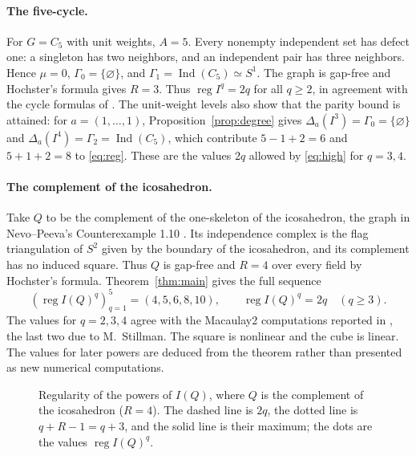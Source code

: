 \documentclass[11pt,a4paper]{article}
\theoremstyle{definition}
\newcommand{\reg}{\operatorname{reg}}
\newcommand{\Ind}{\operatorname{Ind}}
\begin{document}
\paragraph{The five-cycle.}
For $G=C_5$ with unit weights, $A=5$. Every nonempty independent set has defect one: a singleton has two neighbors, and an independent pair has three neighbors. Hence $\mu=0$, $\Gamma_0=\{\varnothing\}$, and $\Gamma_1=\Ind(C_5)\simeq S^1$. The graph is gap-free and Hochster's formula gives $R=3$. Thus $\reg I^q=2q$ for all $q\geq2$, in agreement with the cycle formulas of \cite{BHT}. The unit-weight levels also show that the parity bound is attained: for $a=(1,\ldots,1)$, Proposition~\ref{prop:degree} gives $\Delta_a(I^3)=\Gamma_0=\{\varnothing\}$ and $\Delta_a(I^4)=\Gamma_2=\Ind(C_5)$, which contribute $5-1+2=6$ and $5+1+2=8$ to \eqref{eq:reg}. These are the values $2q$ allowed by \eqref{eq:high} for $q=3,4$.

\paragraph{The complement of the icosahedron.}
Take $Q$ to be the complement of the one-skeleton of the icosahedron, the graph in Nevo--Peeva's Counterexample 1.10 \cite{NP}. Its independence complex is the flag triangulation of $S^2$ given by the boundary of the icosahedron, and its complement has no induced square. Thus $Q$ is gap-free and $R=4$ over every field by Hochster's formula. Theorem~\ref{thm:main} gives the full sequence
\[
 (\reg I(Q)^q)_{q=1}^5=(4,5,6,8,10),\qquad \reg I(Q)^q=2q\quad(q\geq3).
\]
The values for $q=2,3,4$ agree with the Macaulay2 computations reported in \cite[Counterexample 1.10]{NP}, the last two due to M.~Stillman. The square is nonlinear and the cube is linear. The values for later powers are deduced from the theorem rather than presented as new numerical computations.

\begin{figure}[htbp]
\centering
{}
\caption{Regularity of the powers of $I(Q)$, where $Q$ is the complement of the icosahedron ($R=4$). The dashed line is $2q$, the dotted line is $q+R-1=q+3$, and the solid line is their maximum; the dots are the values $\reg I(Q)^q$.}\label{fig:regcurve}
\end{figure}
\end{document}
